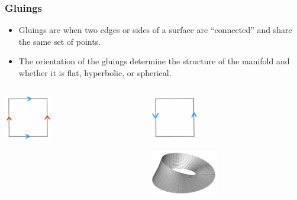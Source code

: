 \documentclass[13pt]{beamer}
\begin{document}
\begin{frame}
\frametitle{Gluings}
	\begin{itemize}
    \item \alert{Gluings} are when two edges or sides of a surface are ``connected'' and share the same set of points.
		\item The orientation of the gluings determine the structure of the manifold and whether it is flat, hyperbolic, or spherical.
	\end{itemize}

  \begin{columns}[r] %
    \begin{column}{.5\textwidth} %
     \centering
     \begin{block}
      \includegraphics[height=2cm]{./img/torusgluing}
     \end{block}
    \end{column}
    \begin{column}{.5\textwidth}
     \centering
     \begin{block}
      \includegraphics[height=2cm]{./img/mobiusgluing}
     \end{block}
     \begin{block}
      \includegraphics[height=2cm]{./img/mobius}
     \end{block}
     \end{column}
  \end{columns}
\end{frame}
\end{document}
